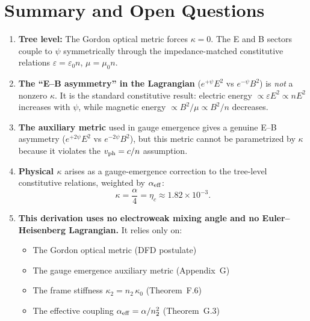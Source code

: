 \documentclass[11pt,a4paper]{article}
\theoremstyle{definition}
\theoremstyle{remark}
\begin{document}
\section{Summary and Open Questions}

\begin{tcolorbox}[colback=blue!5!white, colframe=blue!50!black, title=Summary of Results]
\begin{enumerate}
\item \textbf{Tree level:} The Gordon optical metric forces $\kappa = 0$.
The E and B sectors couple to $\psi$ symmetrically through the
impedance-matched constitutive relations
$\varepsilon = \varepsilon_0 n$, $\mu = \mu_0 n$.

\item \textbf{The ``E--B asymmetry'' in the Lagrangian} ($e^{+\psi}E^2$ vs
$e^{-\psi}B^2$) is \textit{not} a nonzero $\kappa$.  It is the standard
constitutive result: electric energy $\propto \varepsilon E^2 \propto nE^2$
increases with $\psi$, while magnetic energy $\propto B^2/\mu \propto B^2/n$
decreases.

\item \textbf{The auxiliary metric} used in gauge emergence gives a genuine
E--B asymmetry ($e^{+2\psi}E^2$ vs $e^{-2\psi}B^2$), but this metric
cannot be parametrized by $\kappa$ because it violates the
$v_{\rm ph} = c/n$ assumption.

\item \textbf{Physical $\kappa$} arises as a gauge-emergence correction
to the tree-level constitutive relations, weighted by $\alpha_{\rm eff}$:
\begin{equation}
\kappa = \frac{\alpha}{4} = \eta_c \approx 1.82 \times 10^{-3}.
\end{equation}

\item \textbf{This derivation uses no electroweak mixing angle and
no Euler--Heisenberg Lagrangian.}  It relies only on:
\begin{itemize}
\item The Gordon optical metric (DFD postulate)
\item The gauge emergence auxiliary metric (Appendix~G)
\item The frame stiffness $\kappa_2 = n_2\,\kappa_0$ (Theorem~F.6)
\item The effective coupling $\alpha_{\rm eff} = \alpha/n_2^2$ (Theorem~G.3)
\end{itemize}
\end{enumerate}
\end{tcolorbox}
\end{document}
